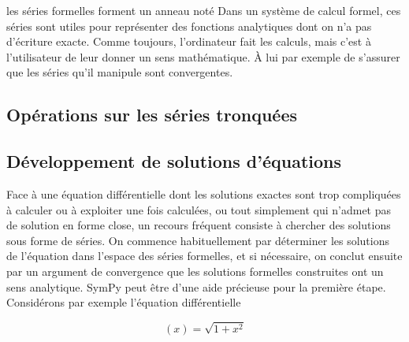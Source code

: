 les séries formelles forment un anneau noté Dans un système de calcul formel, ces séries sont utiles pour représenter des fonctions analytiques dont on n'a pas d’écriture exacte. Comme toujours, l’ordinateur fait les calculs, mais c’est à l'utilisateur de leur donner un sens mathématique. À lui par exemple de s’assurer que les séries qu’il manipule sont convergentes. 
 \subsection{Opérations sur les séries tronquées}
 \subsection{Développement de solutions d’équations}
 Face à une équation différentielle dont les solutions exactes sont trop compliquées à calculer ou à exploiter une fois calculées, ou tout simplement qui n’admet pas de solution en forme close, un recours fréquent consiste à chercher des solutions sous forme de séries. On commence habituellement par déterminer les solutions 
de l’équation dans l’espace des séries formelles, et si nécessaire, on conclut ensuite par un argument de convergence que les solutions formelles construites ont un sens analytique. SymPy peut être d’une aide précieuse pour la première étape. Considérons par exemple l’équation différentielle

\begin{example}
\[
 \left(x\right) = \sqrt{1+x^{2}}
\]
\end{example}

